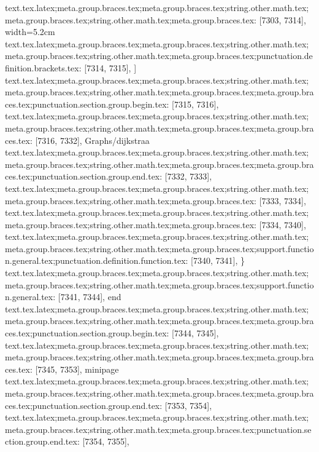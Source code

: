 {{{{{{{{{{{{{{{{{{{{{{{{{{{{{{{{{{{{{{{{{{{{{{{{{{{{{{{{{{{{{{{{{{{{{{{{{{{{{{{{{{{{{{{{{{{{{{{{{{{{{{{{{{{{{{{{{{{{{{{{{{{{{{{{{{{{{{{{{{{{{{{{{{{{{{{{{{{{{{{{{{{{{{{{{{{{{{{{{{{{{{{{{{{{{{{{{{{text.tex.latex;meta.group.braces.tex;meta.group.braces.tex;string.other.math.tex;meta.group.braces.tex;string.other.math.tex;meta.group.braces.tex: [7303, 7314], {width=5.2cm}
text.tex.latex;meta.group.braces.tex;meta.group.braces.tex;string.other.math.tex;meta.group.braces.tex;string.other.math.tex;meta.group.braces.tex;punctuation.definition.brackets.tex: [7314, 7315], {]}
text.tex.latex;meta.group.braces.tex;meta.group.braces.tex;string.other.math.tex;meta.group.braces.tex;string.other.math.tex;meta.group.braces.tex;meta.group.braces.tex;punctuation.section.group.begin.tex: [7315, 7316], {{}
text.tex.latex;meta.group.braces.tex;meta.group.braces.tex;string.other.math.tex;meta.group.braces.tex;string.other.math.tex;meta.group.braces.tex;meta.group.braces.tex: [7316, 7332], {Graphs/dijkstraa}
text.tex.latex;meta.group.braces.tex;meta.group.braces.tex;string.other.math.tex;meta.group.braces.tex;string.other.math.tex;meta.group.braces.tex;meta.group.braces.tex;punctuation.section.group.end.tex: [7332, 7333], {}}
text.tex.latex;meta.group.braces.tex;meta.group.braces.tex;string.other.math.tex;meta.group.braces.tex;string.other.math.tex;meta.group.braces.tex: [7333, 7334], {
}
text.tex.latex;meta.group.braces.tex;meta.group.braces.tex;string.other.math.tex;meta.group.braces.tex;string.other.math.tex;meta.group.braces.tex: [7334, 7340], {      }
text.tex.latex;meta.group.braces.tex;meta.group.braces.tex;string.other.math.tex;meta.group.braces.tex;string.other.math.tex;meta.group.braces.tex;support.function.general.tex;punctuation.definition.function.tex: [7340, 7341], {\}
text.tex.latex;meta.group.braces.tex;meta.group.braces.tex;string.other.math.tex;meta.group.braces.tex;string.other.math.tex;meta.group.braces.tex;support.function.general.tex: [7341, 7344], {end}
text.tex.latex;meta.group.braces.tex;meta.group.braces.tex;string.other.math.tex;meta.group.braces.tex;string.other.math.tex;meta.group.braces.tex;meta.group.braces.tex;punctuation.section.group.begin.tex: [7344, 7345], {{}
text.tex.latex;meta.group.braces.tex;meta.group.braces.tex;string.other.math.tex;meta.group.braces.tex;string.other.math.tex;meta.group.braces.tex;meta.group.braces.tex: [7345, 7353], {minipage}
text.tex.latex;meta.group.braces.tex;meta.group.braces.tex;string.other.math.tex;meta.group.braces.tex;string.other.math.tex;meta.group.braces.tex;meta.group.braces.tex;punctuation.section.group.end.tex: [7353, 7354], {}}
text.tex.latex;meta.group.braces.tex;meta.group.braces.tex;string.other.math.tex;meta.group.braces.tex;string.other.math.tex;meta.group.braces.tex;punctuation.section.group.end.tex: [7354, 7355], {}}
}}}}}}}}}}}}}}}}}}}}}}}}}}}}}}}}}}}}}}}}}}}}}}}}}}}}}}}}}}}}}}}}}}}}}}}}}}}}}}}}}}}}}}}}}}}}}}}}}}}}}}}}}}}}}}}}}}}}}}}}}}}}}}}}}}}}}}}}}}}}}}}}}}}}}}}}}}}}}}}}}}}}}}}}}}}}}}}}}}}}}}}}}}}}}}}}}}}
